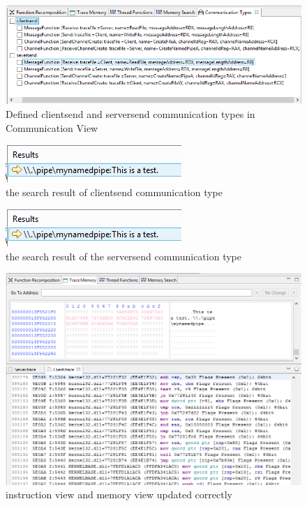 \begin{figure}[H]
\includegraphics[scale=.72]{Figures/addcomtyperesult}
 \caption{Defined clientsend and serversend communication types in Communication View}
\label{addcomtyperesult}
\end{figure}

\begin{figure}[H]
\includegraphics{Figures/occclientresult}
 \caption{the search result of clientsend communication type}
\label{occclientresult}
\end{figure}


\begin{figure}[H]
\includegraphics{Figures/occclientresult}
 \caption{the search result of the serversend communication type}
\label{occclientresult}
\end{figure}

\begin{figure}[H]
\includegraphics[scale=.66]{Figures/send}
 \caption{instruction view and memory view updated correctly}
\label{send}
\end{figure}
